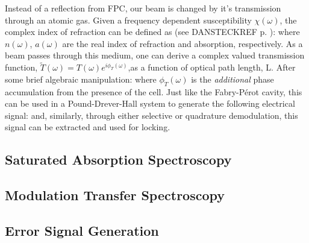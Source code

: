 Instead of a reflection from FPC, our beam is changed by it's transmission through an atomic gas. Given a frequency dependent susceptibility $\chi(\omega)$, the complex index of refraction can be defined as (see DANSTECKREF p. ):
where $n(\omega)$, $a(\omega)$ are the real index of refraction and absorption, respectively. As a beam passes through this medium, one can derive a complex valued transmission function, $\tilde{T}(\omega)=T(\omega)e^{i\phi_T(\omega)}$,as a function of optical path length, L. After some brief algebraic manipulation:
where $\phi_T(\omega)$ is the \emph{additional} phase accumulation from the presence of the cell. Just like the Fabry-P{\'e}rot cavity, this can be used in a Pound-Drever-Hall system to generate the following electrical signal:
and, similarly, through either selective or quadrature demodulation, this signal can be extracted and used for locking.

\subsection{Saturated Absorption Spectroscopy}

\subsection{Modulation Transfer Spectroscopy}

\subsection{Error Signal Generation}

